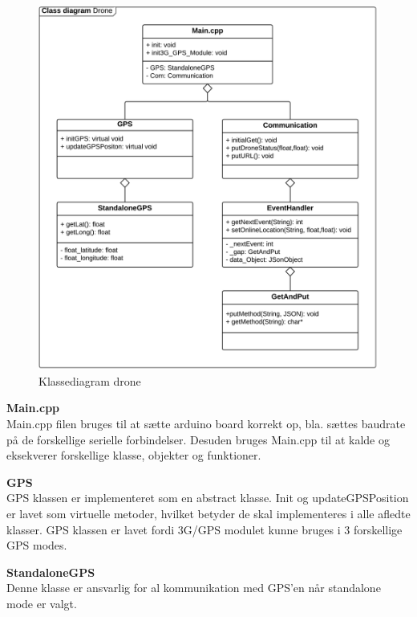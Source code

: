 \begin{figure}[H]
	\centering
	\includegraphics[width=1\textwidth]{Billeder/klasse_diagrammer/classdiagram_iteration1.png}
	\vspace{-0.5cm}
	\caption{Klassediagram drone}
	\label{fig:classDiagram_iteration1}
\end{figure}

\newpage

\textbf{Main.cpp} \\
Main.cpp filen bruges til at sætte arduino board korrekt op, bla. sættes baudrate på de forskellige serielle forbindelser. Desuden bruges Main.cpp til at kalde og eksekverer forskellige klasse, objekter og funktioner.

\textbf{GPS} \\
GPS klassen er implementeret som en abstract klasse. Init og updateGPSPosition er lavet som virtuelle metoder, hvilket betyder de skal implementeres i alle afledte klasser. GPS klassen er lavet fordi 3G/GPS modulet kunne bruges i 3 forskellige GPS modes. 

\textbf{StandaloneGPS}\\
Denne klasse er ansvarlig for al kommunikation med GPS'en når standalone mode er valgt. 

